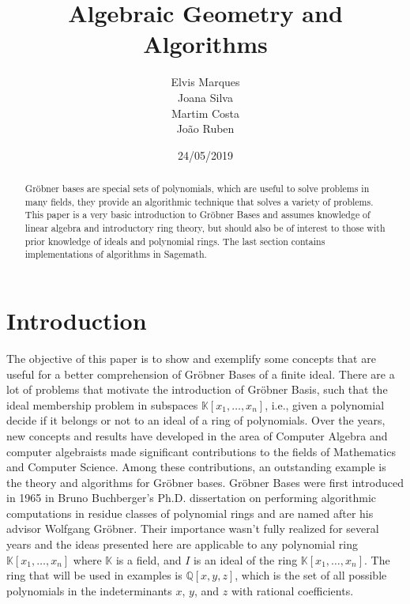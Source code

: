 \documentclass[a4paper,12pt]{article}
\newcommand{\KK}{\mathbb{K}}
\newcommand{\QQ}{\mathbb{Q}}
\begin{document}
\title{Algebraic Geometry and Algorithms}

\author{Elvis Marques  \\ Joana Silva \\ Martim Costa  \\ João Ruben}

\date{24/05/2019}
\maketitle
\begin{abstract}
Gr\"obner bases are special sets of polynomials, which are useful to solve problems in many fields, they provide an algorithmic technique that solves a variety of problems. This paper is a very basic introduction to Gr\"obner Bases and assumes knowledge of linear algebra and introductory ring theory, but should also be of interest to those with prior knowledge of ideals and polynomial rings. The last section contains implementations of algorithms in Sagemath.
\end{abstract}


\section{Introduction}

The objective of this paper is to show and exemplify some concepts that are useful for a better comprehension of Gr\"obner Bases of a finite ideal. 
There are a lot of problems that motivate the introduction of Gr\"obner Basis, such that the ideal membership problem in subspaces $\KK[x_1, \ldots,x_n]$, i.e., given a polynomial decide if it belongs or not to an ideal of a ring of polynomials.
Over the years, new concepts and results have developed in the area of Computer Algebra and computer algebraists made significant contributions to the fields of Mathematics and Computer Science. Among these contributions, an outstanding example is the theory and algorithms for Gr\"obner bases. 
Gr\"obner Bases were first introduced in 1965 in Bruno Buchberger’s Ph.D. dissertation on performing algorithmic computations in residue classes of polynomial rings and are named after his advisor Wolfgang Gr\"obner. Their importance wasn’t fully realized for several years and the ideas presented here are applicable to any polynomial ring $\KK[x_1, \ldots, x_n]$ where $\KK$ is a field, and $I$ is an ideal of the ring $\KK[x_1, \ldots, x_n]$. The ring that will be used in examples is $\QQ[x, y, z]$, which is the set of all possible polynomials in the indeterminants $x$, $y$, and $z$ with rational coefficients. 
\end{document}
